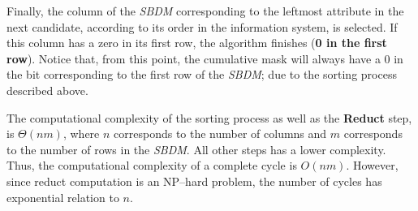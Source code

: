 \documentclass[authoryear,preprint,review,12pt]{elsarticle}
\begin{document}
	Finally, the column of the \textit{SBDM} corresponding to the leftmost attribute in the next candidate, according to its order in the information system, is selected. If this column has a zero in its first row, the algorithm finishes (\textbf{0 in the first row}). Notice that, from this point, the cumulative mask will always have a 0 in the bit corresponding to the first row of the \textit{SBDM}; due to the sorting process described above.
	
	The computational complexity of the sorting process as well as the \textbf{Reduct} step, is $\Theta (nm)$, where $n$ corresponds to the number of columns and $m$ corresponds to the number of rows in the \textit{SBDM}. All other steps has a lower complexity. Thus, the computational complexity of a complete cycle is $O (nm)$. However, since reduct computation is an NP--hard problem, the number of cycles has exponential relation to $n$.
	
\end{document}
